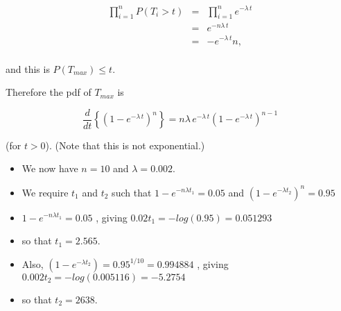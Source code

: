 \documentclass[a4paper,12pt]{article}
\begin{document}
\begin{enumerate}[(a)]
\begin{eqnarray*}
\prod^{n}_{i=1} P(T_i > t )
 &=& \prod^{n}_{i=1}  e^{-\lambda\,t}\\  
 &=& e^{-n\lambda\,t} \\ 
 &=& - e^{-\lambda \,t}  n , \\
\end{eqnarray*}


and this is $P(T_{max}) \leq t$.

Therefore the pdf of $T_{max}$ is 

\[ \frac{d}{dt}\left\{ \left(1-e^{-\lambda\,t} \right)^n  \right\}  =  n \lambda\,e^{-\lambda\,t} (1-e^{-\lambda\,t})^{n-1}\]


(for $t > 0$).
(Note that this is not exponential.)


\begin{itemize}
\item We now have $n = 10$ and $\lambda = 0.002$. 
\item We require $t_1$ and $t_2$ such that $1- e^{-n\lambda t_1} = 0.05$
and $(1- e^{-\lambda t_2})^n = 0.95$
  \item \therefore $1- e^{-n\lambda t_1} = 0.05$ , giving $0.02t_1 = -log(0.95) = 0.051293$ 
\item so that $t_1 = 2.565$.
\item Also, $(1- e^{-\lambda t_2}) = 0.95^{1/10} = 0.994884$ , giving $0.002t_2 = -log(0.005116) = -5.2754$
\item so that $t_2 = 2638$.
\end{itemize}

\end{enumerate}
\end{document}
